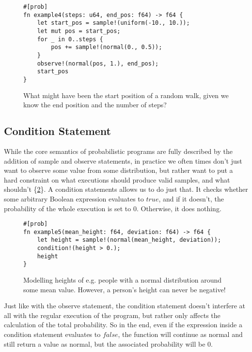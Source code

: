 \begin{figure}[h]
\begin{lstlisting}
#[prob]
fn example4(steps: u64, end_pos: f64) -> f64 {
    let start_pos = sample!(uniform(-10., 10.));
    let mut pos = start_pos;
    for _ in 0..steps {
        pos += sample!(normal(0., 0.5));
    }
    observe!(normal(pos, 1.), end_pos);
    start_pos
}
\end{lstlisting}
\caption{What might have been the start position of a random walk, given we know the end position and the number of steps?}
\label{example4}
\end{figure}


\subsection{Condition Statement}

While the core semantics of probabilistic programs are fully described by the addition of sample and observe statements, in practice we often times don't just want to observe some value from some distribution, but rather want to put a hard constraint on what executions should produce valid samples, and what shouldn't \{\ref{example5}\}. A condition statements allows us to do just that. It checks whether some arbitrary Boolean expression evaluates to $true$, and if it doesn't, the probability of the whole execution is set to $0$. Otherwise, it does nothing.

\begin{figure}[h]
\begin{lstlisting}
#[prob]
fn example5(mean_height: f64, deviation: f64) -> f64 {
    let height = sample!(normal(mean_height, deviation));
    condition!(height > 0.);
    height
}
\end{lstlisting}
\caption{Modelling heights of e.g. people with a normal distribution around some mean value. However, a person's height can never be negative!}
\label{example5}
\end{figure}

Just like with the observe statement, the condition statement doesn't interfere at all with the regular execution of the program, but rather only affects the calculation of the total probability. So in the end, even if the expression inside a condition statement evaluates to $false$, the function will continue as normal and still return a value as normal, but the associated probability will be $0$.

